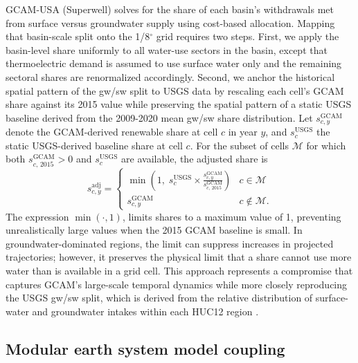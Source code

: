 \documentclass[fleqn,10pt]{wlscirep}
\begin{document}
GCAM-USA (Superwell) solves for the share of each basin's withdrawals met from surface versus groundwater supply using cost-based allocation. Mapping that basin-scale split onto the 1/8$^{\circ}$ grid requires two steps. First, we apply the basin-level share uniformly to all water-use sectors in the basin, except that thermoelectric demand is assumed to use surface water only and the remaining sectoral shares are renormalized accordingly. Second, we anchor the historical spatial pattern of the gw/sw split to USGS data by rescaling each cell's GCAM share against its 2015 value while preserving the spatial pattern of a static USGS baseline derived from the 2009-2020 mean gw/sw share distribution\cite{Stets2025USGS}. Let $s^{\mathrm{GCAM}}_{c,y}$ denote the GCAM-derived renewable share at cell $c$ in year $y$, and $s^{\mathrm{USGS}}_c$ the static USGS-derived baseline share at cell $c$. For the subset of cells $\mathcal{M}$ for which both $s^{\mathrm{GCAM}}_{c,\,2015}>0$ and $s^{\mathrm{USGS}}_c$ are available, the adjusted share is
\begin{equation}
s^{\mathrm{adj}}_{c,y} =
\begin{cases}
\displaystyle \min\!\left(1,\; s^{\mathrm{USGS}}_c \times \frac{s^{\mathrm{GCAM}}_{c,y}}{s^{\mathrm{GCAM}}_{c,\,2015}}\right) & c \in \mathcal{M} \\[10pt]
s^{\mathrm{GCAM}}_{c,y}                                                                                        & c \notin \mathcal{M}.
\end{cases}
\label{eq:source-shares}
\end{equation}
The expression $\min(\cdot,1)$, limits shares to a maximum value of 1, preventing unrealistically large values when the 2015 GCAM baseline is small. In groundwater-dominated regions, the limit can suppress increases in projected trajectories; however, it preserves the physical limit that a share cannot use more water than is available in a grid cell. This approach represents a compromise that captures GCAM's large-scale temporal dynamics while more closely reproducing the USGS gw/sw split, which is derived from the relative distribution of surface-water and groundwater intakes within each HUC12 region \cite{Stets2025USGS}.

\subsection*{Modular earth system model coupling}
\end{document}

